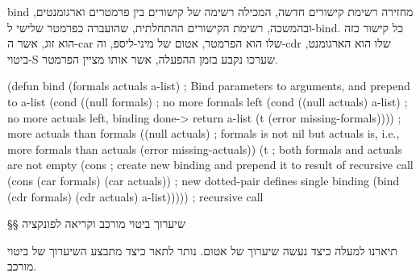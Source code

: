 bind מחזירה רשימת קישורים חדשה, המכילה רשימה של קישורים בין פרמטרים וארגומנטים,
ובהמשכה, רשימת הקישורים ההתחלתית, שהועברה כפרמטר שלישי ל-bind. כל קישור כזה הוא
זוג, אשר ה-car שלו הוא הפרמטר, אטום של מיני-ליספ, וה-cdr שלו הוא הארגומנט, ביטוי-S
שערכו נקבע בזמן ההפעלה, אשר אותו מציין הפרמטר.

\begin{KERNEL}
(defun bind (formals actuals a-list) ; Bind parameters to arguments, and prepend to a-list
  (cond ((null formals) ; no more formals left
        (cond ((null actuals) a-list) ; no more actuals left, binding done-> return a-list
              (t (error missing-formals)))) ; more actuals than formals
        ((null actuals) ; formals is not nil but actuals is, i.e., more formals than actuals
          (error missing-actuals))
        (t ; both formals and actuals are not empty
          (cons ; create new binding and prepend it to result of recursive call
            (cons (car formals) (car actuals)) ; new dotted-pair defines single binding
            (bind (cdr formals) (cdr actuals) a-list))))) ; recursive call
\end{KERNEL}

§§ שיערוך ביטוי מורכב וקריאה לפונקציה

תיארנו למעלה כיצד נעשה שיערוך של אטום. נותר לתאר כיצד מתבצע השיערוך של ביטוי
מורכב.


